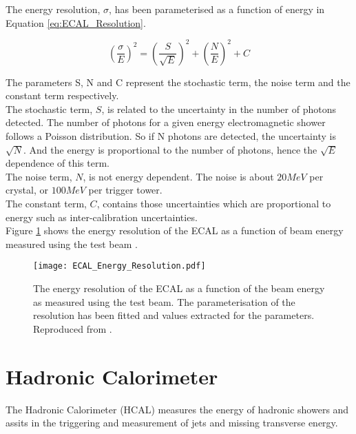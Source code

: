 The energy resolution, $\sigma$, has been parameterised as a function of energy 
in Equation \ref{eq:ECAL_Resolution}. 

\begin{equation}
\left( \frac{\sigma}{E} \right)^{2} = \left( \frac{S}{\sqrt{E}} \right)^{2} +
\left( \frac{N}{E} \right)^{2} + C
\label{eq:ECAL_Resolution}
\end{equation}

The parameters S, N and C represent the stochastic term, the noise term and the
constant term respectively. \\

The stochastic term, $S$, is related to the uncertainty in the number of photons 
detected. The number of photons for a given energy electromagnetic shower 
follows a Poisson distribution. So if N photons are detected, the uncertainty is 
$\sqrt{N}$. And the energy is proportional to the number of photons, hence the 
$\sqrt{E}$ dependence of this term. \\

The noise term, $N$, is not energy dependent. The noise is about $20\unit{MeV}$ 
per crystal, or $100\unit{MeV}$ per trigger tower. \\

The constant term, $C$, contains those uncertainties which are proportional to
energy such as inter-calibration uncertainties. \\

Figure \ref{fig:ECAL_Energy_Resolution} shows the energy resolution of the ECAL
as a function of beam energy measured using the test beam \cite{test_beam}.

\begin{figure}
\begin{center}
\texttt{[image: ECAL\_Energy\_Resolution.pdf]}
\end{center}
\caption{The energy resolution of the ECAL as a function of the beam energy as
measured using the test beam. The parameterisation of the resolution has been 
fitted and values extracted for the parameters. Reproduced from
\cite{test_beam}.}
\label{fig:ECAL_Energy_Resolution}
\end{figure}

\section{Hadronic Calorimeter}

The Hadronic Calorimeter (HCAL) measures the energy of hadronic showers and
assits in the triggering and measurement of jets and missing transverse energy.
\\

